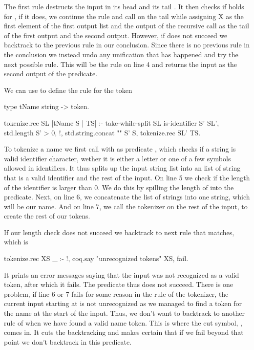\documentclass[thesis.tex]{subfiles}
\begin{document}
{The first rule destructs the input in its head  and its tail . It then checks if  holds for , if it does, we continue the rule and call  on the tail while assigning X as the first element of the first output list and the output of the recursive call as the tail of the first output and the second output. However, if  does not succeed we backtrack to the previous rule in our conclusion. Since there is no previous rule in the conclusion we instead undo any unification that has happened and try the next possible rule. This will be the rule on line 4 and returns the input as the second output of the predicate.

We can use  to define the rule for the token 
\begin{elpicode}
  type tName string -> token.

  tokenize.rec SL [tName S | TS] :-
    take-while-split SL is-identifier S' SL',
    { std.length S' } > 0, !,
    std.string.concat "" S' S,
    tokenize.rec SL' TS.
\end{elpicode}
To tokenize a name we first call  with as predicate , which checks if a string is valid identifier character, wether it is either a letter or one of a few symbols allowed in identifiers. It thus splits up the input string list into an list of string that is a valid identifier and the rest of the input.
On line 5 we check if the length of the identifier is larger than 0. We do this by spilling the length of  into the \elpiinline{>} predicate.
Next, on line 6, we concatenate the list of strings into one string, which will be our name.
And on line 7, we call the tokenizer on the rest of the input, to create the rest of our tokens.

If our length check does not succeed we backtrack to next rule that matches, which is
\begin{elpicode}
  tokenize.rec XS _ :- !, 
    coq.say "unrecognized tokens" XS, fail.  
\end{elpicode}
It prints an error messages saying that the input was not recognized as a valid token, after which it fails. The predicate thus does not succeed. There is one problem, if line 6 or 7 fails for some reason in the  rule of the tokenizer, the current input starting at  is not unrecognized as we managed to find a token for the name at the start of the input. Thus, we don't want to backtrack to another rule of  when we have found a valid name token. This is where the cut symbol, \elpiinline{!}, comes in. It cuts the backtracking and makes certain that if we fail beyond that point we don't backtrack in this predicate.

}
\end{document}
